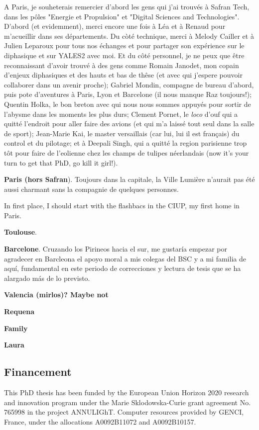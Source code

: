 A Paris, je souheterais remercier d'abord les gens qui j'ai trouvés à Safran Tech, dans les pôles "Energie et Propulsion" et "Digital Sciences and Technologies". D'abord (et evidemment), merci encore une fois à Léa et à Renaud pour m'acueillir dans ses départements. Du còté technique, merci à Melody Cailler et à Julien Leparoux pour tous nos échanges et pour partager son expérience sur le diphasique et sur YALES2 avec moi.  Et du côté personnel, je ne peux que être reconnaissant d'avoir trouvé à des gens comme Romain Janodet, mon copain d'enjeux diphasiques et des hauts et bas de thêse (et avec qui j'espere pouvoir collaborer dans un avenir proche); Gabriel Mondin, compagne de bureau d'abord, puis pote d'aventures à Paris, Lyon et Barcelone (il nous manque Raz toujours!); Quentin Holka, le bon breton avec qui nous nous sommes appuyés pour sortir de l'abysme dans les moments les plus durs; Clement Pornet, le \textsl{loco} d'ouf qui a quitté l'endroit pour aller faire des avions (et qui m'a laissé tout seul dans la salle de sport); Jean-Marie Kai, le master versaillais (car lui, lui il est français) du control et du pilotage; et à Deepali Singh, qui a quitté la region parisienne trop tôt pour faire de l'eolienne chez les champs de tulipes néerlandais (now it's your turn to get that PhD, go kill it girl!).
  
\textbf{Paris (hors Safran}).  Toujours dans la capitale, la Ville Lumière n'aurait pas été aussi charmant sans la compagnie de quelques personnes.

In first place, I should start with the flashbacs in the CIUP, my first home in Paris.



\textbf{Toulouse}. 

\textbf{Barcelone}. Cruzando los Pirineos hacia el sur, me gustaría empezar por agradecer en Barcleona el apoyo moral a mis colegas del BSC y a mi familia de aquí, fundamental en este periodo de correcciones y lectura de tesis que se ha alargado más de lo previsto. 


\textbf{Valencia (mirlos)? Maybe not}


\textbf{Requena}


\textbf{Family}


\textbf{Laura}


\subsection*{Financement}

This PhD thesis has been funded by the European Union Horizon 2020 research and innovation program under the Marie Sklodowska-Curie grant agreement No. 765998 in the project ANNULIGhT. Computer resources provided by GENCI, France, under the allocations A0092B11072 and A0092B10157.

